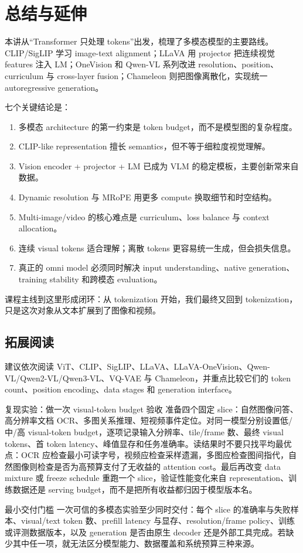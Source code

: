 \documentclass[a4paper]{article}
\begin{document}
\section{总结与延伸}

本讲从“Transformer 只处理 tokens”出发，梳理了多模态模型的主要路线。CLIP/SigLIP 学习 image-text alignment；LLaVA 用 projector 把连续视觉 features 注入 LM；OneVision 和 Qwen-VL 系列改进 resolution、position、curriculum 与 cross-layer fusion；Chameleon 则把图像离散化，实现统一 autoregressive generation。

七个关键结论是：

\begin{enumerate}
\item 多模态 architecture 的第一约束是 token budget，而不是模型图的复杂程度。
\item CLIP-like representation 擅长 semantics，但不等于细粒度视觉理解。
\item Vision encoder + projector + LM 已成为 VLM 的稳定模板，主要创新常来自数据。
\item Dynamic resolution 与 MRoPE 用更多 compute 换取细节和时空结构。
\item Multi-image/video 的核心难点是 curriculum、loss balance 与 context allocation。
\item 连续 visual tokens 适合理解；离散 tokens 更容易统一生成，但会损失信息。
\item 真正的 omni model 必须同时解决 input understanding、native generation、training stability 和跨模态 evaluation。
\end{enumerate}

课程主线到这里形成闭环：从 tokenization 开始，我们最终又回到 tokenization，只是这次对象从文本扩展到了图像和视频。

\subsection{拓展阅读}

建议依次阅读 ViT、CLIP、SigLIP、LLaVA、LLaVA-OneVision、Qwen-VL/Qwen2-VL/Qwen3-VL、VQ-VAE 与 Chameleon，并重点比较它们的 token count、position encoding、data stages 和 generation interface。

\begin{knowledgebox}{复现实验：做一次 visual-token budget 验收}
准备四个固定 slice：自然图像问答、高分辨率文档 OCR、多图关系推理、短视频事件定位。对同一模型分别设置低/中/高 visual-token budget，逐项记录输入分辨率、tile/frame 数、最终 visual tokens、首 token latency、峰值显存和任务准确率。读结果时不要只找平均最优点：OCR 应检查最小可读字号，视频应检查采样遗漏，多图应检查图间指代，自然图像则检查是否为高预算支付了无收益的 attention cost。最后再改变 data mixture 或 freeze schedule 重跑一个 slice，验证性能变化来自 representation、训练数据还是 serving budget，而不是把所有收益都归因于模型版本名。
\end{knowledgebox}

\begin{importantbox}{最小交付门槛}
一次可信的多模态实验至少同时交付：每个 slice 的准确率与失败样本、visual/text token 数、prefill latency 与显存、resolution/frame policy、训练或评测数据版本，以及 generation 是否由原生 decoder 还是外部工具完成。若缺少其中任一项，就无法区分模型能力、数据覆盖和系统预算三种来源。
\end{importantbox}
\end{document}
